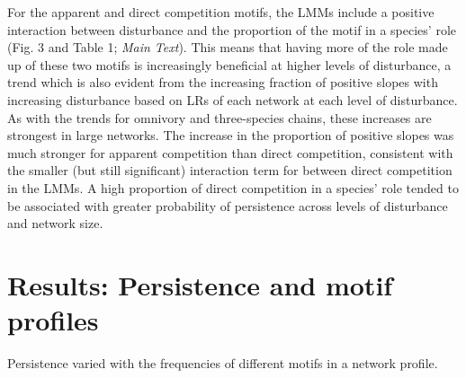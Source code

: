 \documentclass[12pt]{article}
\begin{document}
\begin{spacing}{2.0}
    For the apparent and direct competition motifs, the LMMs include a positive interaction between disturbance and the proportion of the motif in a species' role (Fig. 3 and Table 1; \emph{Main Text}).
    This means that having more of the role made up of these two motifs is increasingly beneficial at higher levels of disturbance, a trend which is also evident from the increasing fraction of positive slopes with increasing disturbance based on LRs of each network at each level of disturbance. %
    As with the trends for omnivory and three-species chains, these increases are strongest in large networks. %
    The increase in the proportion of positive slopes was much stronger for apparent competition than direct competition, consistent with the smaller (but still significant) interaction term for between direct competition in the LMMs.
    A high proportion of direct competition in a species' role tended to be associated with greater probability of persistence across levels of disturbance and network size.
\clearpage
                
\section{Results: Persistence and motif profiles}

    Persistence varied with the frequencies of different motifs in a network profile.


\end{spacing}
\end{document}
